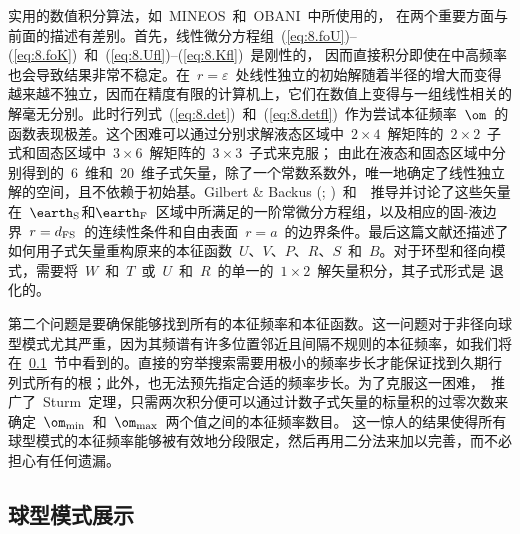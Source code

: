 实用的数值积分算法，如~MINEOS~和~OBANI~中所使用的，
%
%
在两个重要方面与前面的描述有差别。首先，线性微分方程组~(\ref{eq:8.foU})--(\ref{eq:8.foK})~和~(\ref{eq:8.Ufl})--(\ref{eq:8.Kfl})~是刚性的，
%
因而直接积分即使在中高频率也会导致结果非常不稳定。在~$r=\varepsilon$~处线性独立的初始解随着半径的增大而变得越来越不独立，因而在精度有限的计算机上，它们在数值上变得与一组线性相关的解毫无分别。此时行列式~(\ref{eq:8.det})~和~(\ref{eq:8.detfl})~作为尝试本征频率~$\om$~的函数表现极差。这个困难可以通过分别求解液态区域中~$2\times 4$~解矩阵的~$2\times 2$~子式和固态区域中~$3\times 6$~解矩阵的~$3\times 3$~子式来克服；
%
由此在液态和固态区域中分别得到的~6~维和~20~维子式矢量，除了一个常数系数外，唯一地确定了线性独立解的空间，且不依赖于初始基。Gilbert \& Backus (\citeyear{gilbert&backus66}; \citeyear{gilbert&backus69})~和~\textcite{woodhouse88}~推导并讨论了这些矢量在~$\earth_{\rm S}$和$\earth_{\rm F}$~区域中所满足的一阶常微分方程组，以及相应的固-液边界~$r=d_{\rm FS}$~的连续性条件和自由表面~$r=a$~的边界条件。最后这篇文献还描述了如何用子式矢量重构原来的本征函数~$U$、$V$、$P$、$R$、$S$~和~$B$。对于环型和径向模式，需要将~$W$~和~$T$~或~$U$~和~$R$~的单一的~$1\times 2$~解矢量积分，其子式形式是
退化的。

第二个问题是要确保能够找到所有的本征频率和本征函数。这一问题对于非径向球型模式尤其严重，因为其频谱有许多位置邻近且间隔不规则的本征频率，如我们将在~\ref{sec:8.spherfigs}~节中看到的。直接的穷举搜索需要用极小的频率步长才能保证找到久期行列式所有的根；此外，也无法预先指定合适的频率步长。为了克服这一困难，\textcite{woodhouse88}~推广了~Sturm~定理，只需两次积分便可以通过计数子式矢量的标量积的过零次数来确定~$\om_{\rm min}$~和~$\om_{\rm max}$~两个值之间的本征频率数目。
%
这一惊人的结果使得所有球型模式的本征频率能够被有效地分段限定，然后再用二分法来加以完善，而不必担心有任何遗漏。

\subsection{球型模式展示}
\label{sec:8.spherfigs}

